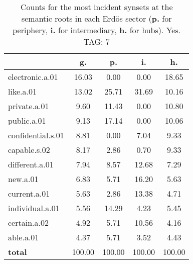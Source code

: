 \begin{table}[h!]
\begin{center}
\begin{tabular}{| l | c | c | c | c |}\hline
 & g. & p. & i. & h. \\\hline
electronic.a.01 & 16.03  & 0.00  & 0.00  & 18.65 \\\hline
like.a.01 & 13.02  & 25.71  & 31.69  & 10.16 \\\hline
private.a.01 & 9.60  & 11.43  & 0.00  & 10.80 \\\hline
public.a.01 & 9.13  & 17.14  & 0.00  & 10.06 \\\hline
confidential.s.01 & 8.81  & 0.00  & 7.04  & 9.33 \\\hline
capable.s.02 & 8.17  & 2.86  & 0.70  & 9.33 \\\hline
different.a.01 & 7.94  & 8.57  & 12.68  & 7.29 \\\hline
new.a.01 & 6.83  & 5.71  & 16.20  & 5.63 \\\hline
current.a.01 & 5.63  & 2.86  & 13.38  & 4.71 \\\hline
individual.a.01 & 5.56  & 14.29  & 4.23  & 5.45 \\\hline
certain.a.02 & 4.92  & 5.71  & 10.56  & 4.16 \\\hline
able.a.01 & 4.37  & 5.71  & 3.52  & 4.43 \\\hline
{{\bf total}} & 100.00  & 100.00  & 100.00  & 100.00 \\\hline
\end{tabular}
\caption{Counts for the most incident synsets at the semantic roots in each Erd\"os sector ({\bf p.} for periphery, {\bf i.} for intermediary, {\bf h.} for hubs). Yes. TAG: 7}
\end{center}
\end{table}